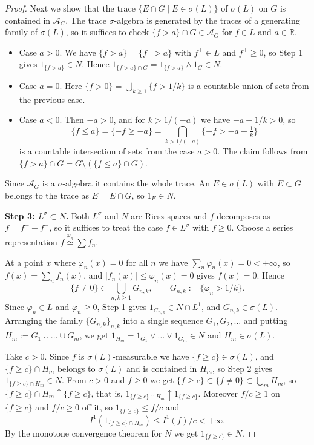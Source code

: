 \begin{proof}
  Next we show that the trace $\{E\cap G\mid E\in\sigma(L)\}$ of $\sigma(L)$ on
  $G$ is contained in $\mathcal{A}_G$.
  The trace $\sigma$-algebra is generated by the traces of a generating family of
  $\sigma(L)$, so it suffices to check $\{f>a\}\cap G\in\mathcal{A}_G$ for
  $f\in L$ and $a\in\mathbb{R}$.
  \begin{itemize}
    \item Case $a>0$. We have $\{f>a\}=\{f^+>a\}$ with $f^+\in L$ and
      $f^+\ge0$, so Step 1 gives $1_{\{f>a\}}\in N$. Hence
      $1_{\{f>a\}\cap G}=1_{\{f>a\}}\land1_G\in N$.
    \item Case $a=0$. Here $\{f>0\}=\bigcup_{k\ge1}\{f>1/k\}$ is a countable
      union of sets from the previous case.
    \item Case $a<0$. Then $-a>0$, and for $k>1/(-a)$ we have $-a-1/k>0$, so
      \[
        \{f\le a\}=\{-f\ge-a\}=\bigcap_{k>1/(-a)}\{-f>-a-\tfrac1k\}
      \]
      is a countable intersection of sets from the case $a>0$. The claim follows
      from $\{f>a\}\cap G=G\setminus(\{f\le a\}\cap G)$.
  \end{itemize}
  Since $\mathcal{A}_G$ is a $\sigma$-algebra it contains the whole trace.
  An $E\in\sigma(L)$ with $E\subset G$ belongs to the trace as $E=E\cap G$, so
  $1_E\in N$.

  \textbf{Step 3: $L^{\sigma}\subset N$.}
  Both $L^{\sigma}$ and $N$ are Riesz spaces and $f$ decomposes as
  $f=f^+-f^-$, so it suffices to treat the case $f\in L^{\sigma}$ with $f\ge0$.
  Choose a series representation $f\overset{\varphi_n}{\simeq}\sum f_n$.

  At a point $x$ where $\varphi_n(x)=0$ for all $n$ we have
  $\sum_n\varphi_n(x)=0<+\infty$, so $f(x)=\sum_nf_n(x)$, and
  $|f_n(x)|\le\varphi_n(x)=0$ gives $f(x)=0$. Hence
  \[
    \{f\ne0\}\subset\bigcup_{n,k\ge1}G_{n,k},
    \qquad
    G_{n,k}:=\{\varphi_n>1/k\} .
  \]
  Since $\varphi_n\in L$ and $\varphi_n\ge0$, Step 1 gives
  $1_{G_{n,k}}\in N\cap L^1$, and $G_{n,k}\in\sigma(L)$.
  Arranging the family $\{G_{n,k}\}_{n,k}$ into a single sequence
  $G_1,G_2,\dots$ and putting $H_m:=G_1\cup\dots\cup G_m$, we get
  $1_{H_m}=1_{G_1}\lor\dots\lor1_{G_m}\in N$ and $H_m\in\sigma(L)$.

  Take $c>0$. Since $f$ is $\sigma(L)$-measurable we have
  $\{f\ge c\}\in\sigma(L)$, and $\{f\ge c\}\cap H_m$ belongs to $\sigma(L)$ and
  is contained in $H_m$, so Step 2 gives
  $1_{\{f\ge c\}\cap H_m}\in N$.
  From $c>0$ and $f\ge0$ we get
  $\{f\ge c\}\subset\{f\ne0\}\subset\bigcup_mH_m$, so
  $\{f\ge c\}\cap H_m\uparrow\{f\ge c\}$, that is,
  $1_{\{f\ge c\}\cap H_m}\uparrow1_{\{f\ge c\}}$.
  Moreover $f/c\ge1$ on $\{f\ge c\}$ and $f/c\ge0$ off it, so
  $1_{\{f\ge c\}}\le f/c$ and
  \[
    I^1(1_{\{f\ge c\}\cap H_m})\le I^1(f)/c<+\infty.
  \]
  By the monotone convergence theorem for $N$ we get $1_{\{f\ge c\}}\in N$.


\end{proof}

